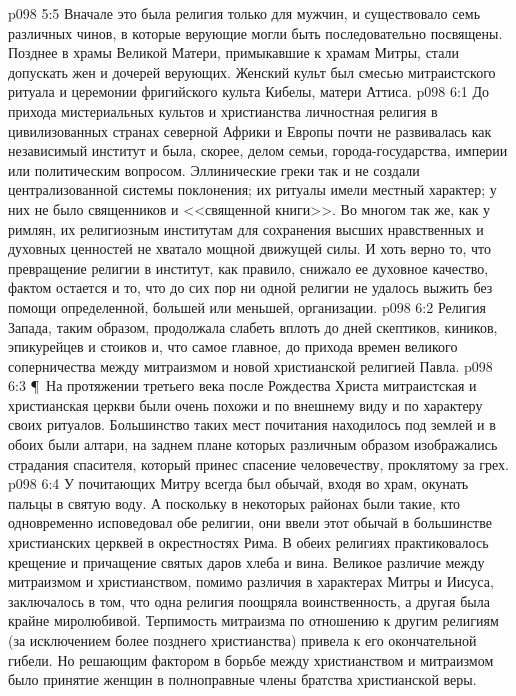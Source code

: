 \vs p098 5:5 Вначале это была религия только для мужчин, и существовало семь различных чинов, в которые верующие могли быть последовательно посвящены. Позднее в храмы Великой Матери, примыкавшие к храмам Митры, стали допускать жен и дочерей верующих. Женский культ был смесью митраистского ритуала и церемонии фригийского культа Кибелы, матери Аттиса.
\vs p098 6:1 До прихода мистериальных культов и христианства личностная религия в цивилизованных странах северной Африки и Европы почти не развивалась как независимый институт и была, скорее, делом семьи, города\hyp{}государства, империи или политическим вопросом. Эллинические греки так и не создали централизованной системы поклонения; их ритуалы имели местный характер; у них не было священников и <<священной книги>>. Во многом так же, как у римлян, их религиозным институтам для сохранения высших нравственных и духовных ценностей не хватало мощной движущей силы. И хоть верно то, что превращение религии в институт, как правило, снижало ее духовное качество, фактом остается и то, что до сих пор ни одной религии не удалось выжить без помощи определенной, большей или меньшей, организации.
\vs p098 6:2 Религия Запада, таким образом, продолжала слабеть вплоть до дней скептиков, киников, эпикурейцев и стоиков и, что самое главное, до прихода времен великого соперничества между митраизмом и новой христианской религией Павла.
\vs p098 6:3 \P\ На протяжении третьего века после Рождества Христа митраистская и христианская церкви были очень похожи и по внешнему виду и по характеру своих ритуалов. Большинство таких мест почитания находилось под землей и в обоих были алтари, на заднем плане которых различным образом изображались страдания спасителя, который принес спасение человечеству, проклятому за грех.
\vs p098 6:4 У почитающих Митру всегда был обычай, входя во храм, окунать пальцы в святую воду. А поскольку в некоторых районах были такие, кто одновременно исповедовал обе религии, они ввели этот обычай в большинстве христианских церквей в окрестностях Рима. В обеих религиях практиковалось крещение и причащение святых даров хлеба и вина. Великое различие между митраизмом и христианством, помимо различия в характерах Митры и Иисуса, заключалось в том, что одна религия поощряла воинственность, а другая была крайне миролюбивой. Терпимость митраизма по отношению к другим религиям (за исключением более позднего христианства) привела к его окончательной гибели. Но решающим фактором в борьбе между христианством и митраизмом было принятие женщин в полноправные члены братства христианской веры.
